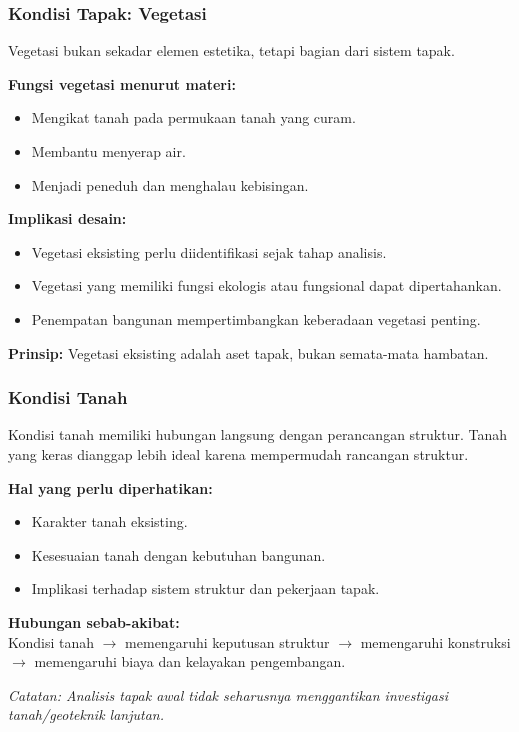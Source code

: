 \documentclass[../main.tex]{subfiles}
\begin{document}
\begin{frame}[mytitle=imageplus, t, mycolor=digiPH_gray, light]
	\frametitle{Kondisi Tapak: Vegetasi}

	Vegetasi bukan sekadar elemen estetika, tetapi bagian dari sistem tapak.

	\vspace{0.3cm}
	\textbf{Fungsi vegetasi menurut materi:}
	\begin{itemize}
		\item Mengikat tanah pada permukaan tanah yang curam.
		\item Membantu menyerap air.
		\item Menjadi peneduh dan menghalau kebisingan.
	\end{itemize}

	\textbf{Implikasi desain:}
	\begin{itemize}
		\item Vegetasi eksisting perlu diidentifikasi sejak tahap analisis.
		\item Vegetasi yang memiliki fungsi ekologis atau fungsional dapat dipertahankan.
		\item Penempatan bangunan mempertimbangkan keberadaan vegetasi penting.
	\end{itemize}

	\vspace{0.2cm}
	\textbf{Prinsip:} Vegetasi eksisting adalah aset tapak, bukan semata-mata hambatan.
\end{frame}

\begin{frame}[mytitle=standard, t, mycolor=digiPH_white, light]
	\frametitle{Kondisi Tanah}

	Kondisi tanah memiliki hubungan langsung dengan perancangan struktur. Tanah yang keras dianggap lebih ideal karena mempermudah rancangan struktur.

	\vspace{0.3cm}
	\textbf{Hal yang perlu diperhatikan:}
	\begin{itemize}
		\item Karakter tanah eksisting.
		\item Kesesuaian tanah dengan kebutuhan bangunan.
		\item Implikasi terhadap sistem struktur dan pekerjaan tapak.
	\end{itemize}

	\vspace{0.3cm}
	\textbf{Hubungan sebab-akibat:}\\
	Kondisi tanah $\rightarrow$ memengaruhi keputusan struktur $\rightarrow$ memengaruhi konstruksi $\rightarrow$ memengaruhi biaya dan kelayakan pengembangan.

	\vspace{0.2cm}
	\footnotesize{\textit{Catatan: Analisis tapak awal tidak seharusnya menggantikan investigasi tanah/geoteknik lanjutan.}}
\end{frame}
\end{document}

